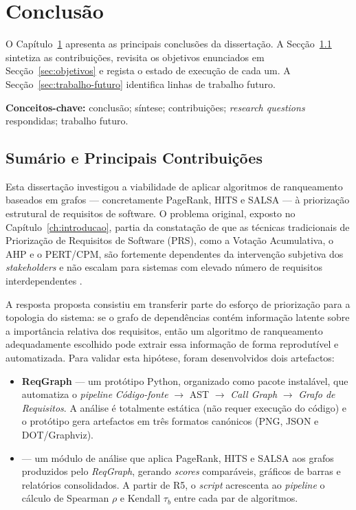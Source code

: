 \chapter{Conclusão}
\label{ch:conclusao}

O Capítulo~\ref{ch:conclusao} apresenta as principais conclusões da
dissertação. A Secção~\ref{sec:sumario} sintetiza as contribuições,
revisita os objetivos enunciados em
Secção~\ref{sec:objetivos} e regista o estado de execução de cada
um. A Secção~\ref{sec:trabalho-futuro} identifica linhas de trabalho
futuro.

\noindent\textbf{Conceitos-chave:} conclusão; síntese;
contribuições; \emph{research questions} respondidas; trabalho
futuro.

\section{Sumário e Principais Contribuições}
\label{sec:sumario}

Esta dissertação investigou a viabilidade de aplicar algoritmos de
ranqueamento baseados em grafos --- concretamente PageRank, HITS e
SALSA --- à priorização estrutural de requisitos de software. O
problema original, exposto no Capítulo~\ref{ch:introducao}, partia da
constatação de que as técnicas tradicionais de Priorização de
Requisitos de Software (PRS), como a Votação Acumulativa, o AHP e o
PERT/CPM, são fortemente dependentes da intervenção subjetiva dos
\emph{stakeholders} e não escalam para sistemas com elevado número
de requisitos interdependentes
\parencite{silva2018, achimugu2014, bukhsh2020}.

A resposta proposta consistiu em transferir parte do esforço de
priorização para a topologia do sistema: se o grafo de dependências
contém informação latente sobre a importância relativa dos
requisitos, então um algoritmo de ranqueamento adequadamente
escolhido pode extrair essa informação de forma reprodutível e
automatizada. Para validar esta hipótese, foram desenvolvidos dois
artefactos:

\begin{itemize}
    \item \textbf{ReqGraph} --- um protótipo Python, organizado
        como pacote instalável, que automatiza o \emph{pipeline}
        \emph{Código-fonte} $\rightarrow$ AST $\rightarrow$
        \emph{Call Graph} $\rightarrow$ \emph{Grafo de Requisitos}.
        A análise é totalmente estática (não requer execução do
        código) e o protótipo gera artefactos em três formatos
        canónicos (PNG, JSON e DOT/Graphviz).
    \item {} --- um módulo de análise que aplica
        PageRank, HITS e SALSA aos grafos produzidos pelo
        \emph{ReqGraph}, gerando \emph{scores} comparáveis, gráficos
        de barras e relatórios consolidados. A partir de R5, o
        \emph{script}  acrescenta
        ao \emph{pipeline} o cálculo de Spearman $\rho$ e Kendall
        $\tau_b$ entre cada par de algoritmos.
\end{itemize}

